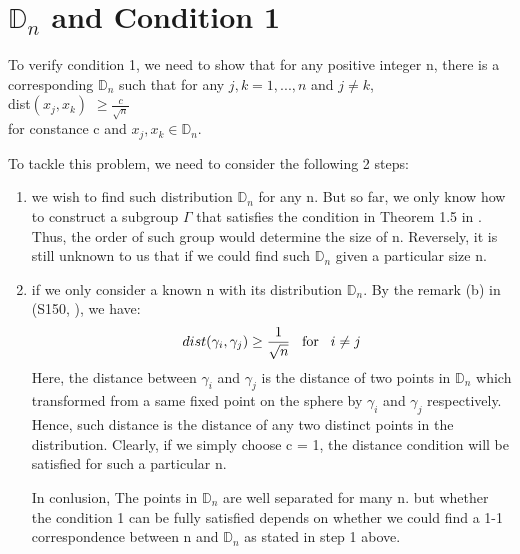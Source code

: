 \documentclass[12pt]{article}
\numberwithin{equation}{section}
\let\bb\mathbb
\let\bb\mathbb
\begin{document}
	\section{$\bb{D}_n$ and Condition 1 }
	To verify condition 1, we need to show that for any positive integer n, there is a corresponding $\bb{D}_n$ such that for any $j,k = 1,..., n$ and $j\neq k$, \\
	dist$(x_j, x_k)$ $\geq \frac{c}{\sqrt{n}}$ \\
	for constance c and $x_j,x_k \in \bb{D}_n$.\par 
	To tackle this problem, we need to consider the following 2 steps:\\
	\begin{enumerate}
		\item we wish to find such distribution $\bb{D}_n$ for any n. But so far, we only know how to construct a subgroup $\Gamma$ that satisfies the condition in Theorem 1.5 in \cite{lubotzky_1986_hecke}. Thus, the order of such group would determine the size of n. Reversely, it is still unknown to us that if we could find such $\bb{D}_n$ given a particular size n.
		\item if we only consider a known n with its distribution $\bb{D}_n$. By the remark (b) in (S150, \cite{lubotzky_1986_hecke}), we have:\\
			\[ dist(\gamma_i, \gamma_j) \geq \frac{1}{\sqrt{n}} \hspace{3mm} \text{for} \hspace{3mm} i \neq j \]
			Here, the distance between $\gamma_i$ and $ \gamma_j$ is the distance of two points in $\bb{D}_n$ which transformed from a same fixed point on the sphere by $\gamma_i$ and $\gamma_j$ respectively. Hence, such distance is the distance of any two distinct points in the distribution. Clearly, if we simply choose c = 1, the distance condition will be satisfied for such a particular n.\par 
			In conlusion, The points in $\bb{D}_n$ are well separated for many n. but whether the condition 1 can be fully satisfied depends on whether we could find a 1-1 correspondence between n and $\bb{D}_n$ as stated in step 1 above.
	\end{enumerate}
	
	
	\newpage
\end{document}
